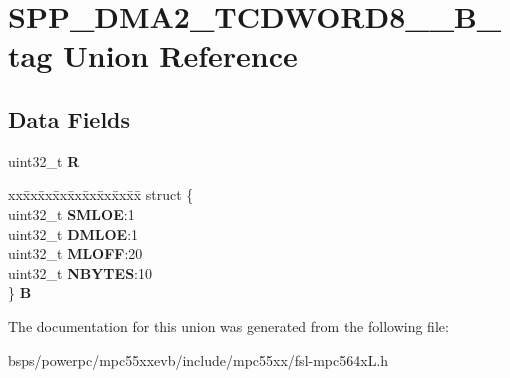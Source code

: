 \hypertarget{unionSPP__DMA2__TCDWORD8____32B__tag}{}\section{S\+P\+P\+\_\+\+D\+M\+A2\+\_\+\+T\+C\+D\+W\+O\+R\+D8\+\_\+\+\_\+B\+\_\+tag Union Reference}
\label{unionSPP__DMA2__TCDWORD8____32B__tag}
\subsection*{Data Fields}
\begin{DoxyCompactItemize}
\item 
\mbox{\label{unionSPP__DMA2__TCDWORD8____32B__tag_a14482babf1cfc5747500c4737e4b846d}} 
uint32\+\_\+t {\bfseries R}
\item 
\mbox{\label{unionSPP__DMA2__TCDWORD8____32B__tag_a912751e13eb6748e648546c1b18bb793}} 
\begin{tabbing}
xx\=xx\=xx\=xx\=xx\=xx\=xx\=xx\=xx\=\kill
struct \{\\
\>uint32\_t {\bfseries SMLOE}:1\\
\>uint32\_t {\bfseries DMLOE}:1\\
\>uint32\_t {\bfseries MLOFF}:20\\
\>uint32\_t {\bfseries NBYTES}:10\\
\} {\bfseries B}\\

\end{tabbing}\end{DoxyCompactItemize}


The documentation for this union was generated from the following file\+:\begin{DoxyCompactItemize}
\item 
bsps/powerpc/mpc55xxevb/include/mpc55xx/fsl-\/mpc564x\+L.\+h\end{DoxyCompactItemize}
